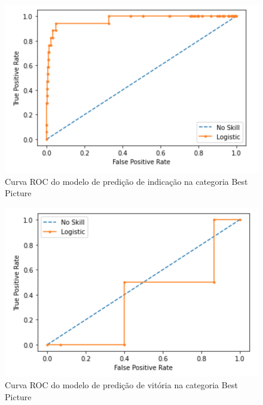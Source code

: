        \begin{figure}[htb]
        	\caption{\label{roc1}Curva ROC do modelo de predição de indicação na categoria Best Picture}
        	\begin{center}
        		\includegraphics[scale=0.7]{roc1.png}
        	\end{center}
        \end{figure}
        
        \begin{figure}[htb]
        	\caption{\label{roc2}Curva ROC do modelo de predição de vitória na categoria Best Picture}
        	\begin{center}
        		\includegraphics[scale=0.7]{roc2.png}
        	\end{center}
        \end{figure}
        
